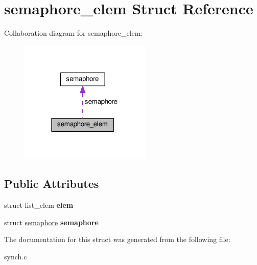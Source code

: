 \hypertarget{structsemaphore__elem}{}\section{semaphore\+\_\+elem Struct Reference}
\label{structsemaphore__elem}


Collaboration diagram for semaphore\+\_\+elem\+:
\nopagebreak
\begin{figure}[H]
\begin{center}
\leavevmode
\includegraphics[width=178pt]{structsemaphore__elem__coll__graph}
\end{center}
\end{figure}
\subsection*{Public Attributes}
\begin{DoxyCompactItemize}
\item 
struct list\+\_\+elem {\bfseries elem}\hypertarget{structsemaphore__elem_a1156a1cac7fcbc1447b40867da1ce406}{}\label{structsemaphore__elem_a1156a1cac7fcbc1447b40867da1ce406}

\item 
struct \hyperlink{structsemaphore}{semaphore} {\bfseries semaphore}\hypertarget{structsemaphore__elem_af1b97cc65c3aabff2f3da9335e3784a9}{}\label{structsemaphore__elem_af1b97cc65c3aabff2f3da9335e3784a9}

\end{DoxyCompactItemize}


The documentation for this struct was generated from the following file\+:\begin{DoxyCompactItemize}
\item 
synch.\+c\end{DoxyCompactItemize}
